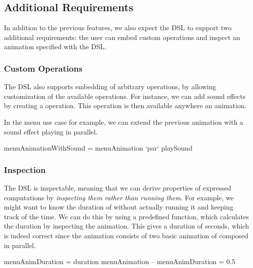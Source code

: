 \subsection{Additional Requirements}

In addition to the previous features, we also expect the DSL to support two additional requirements: the user can embed custom operations and inspect an animation specified with the DSL.

\subsubsection{Custom Operations}


The DSL also supports embedding of arbitrary operations, by allowing customization of the available operations. For instance, we can add sound effects by creating a  operation. This operation is then available anywhere an animation.

In the menu use case for example, we can extend the previous  animation with a sound effect playing in parallel.

\begin{spec}
menuAnimationWithSound = menuAnimation `par` playSound
\end{spec}

\subsubsection{Inspection}

The DSL is inspectable, meaning that we can derive properties of expressed computations by \emph{inspecting them rather than running them}. For example, we might want to know the duration of  without actually running it and keeping track of the time. We can do this by using a predefined  function, which calculates the duration by inspecting the animation. This gives a duration of  seconds, which is indeed correct since the animation consists of two basic animation of  composed in parallel.

\begin{spec}
menuAnimDuration = duration menuAnimation
-- menuAnimDuration = 0.5 
\end{spec}

